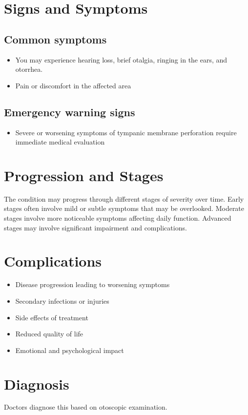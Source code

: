 \section{Signs and Symptoms}
\subsection{Common symptoms}
\begin{itemize}[noitemsep]
  \item You may experience hearing loss, brief otalgia, ringing in the ears, and otorrhea.
  \item Pain or discomfort in the affected area
  \end{itemize}
\subsection{Emergency warning signs}
\begin{itemize}[noitemsep]
  \item Severe or worsening symptoms of tympanic membrane perforation require immediate medical evaluation
\end{itemize}
\section{Progression and Stages}
The condition may progress through different stages of severity over time. Early stages often involve mild or subtle symptoms that may be overlooked. Moderate stages involve more noticeable symptoms affecting daily function. Advanced stages may involve significant impairment and complications.
\section{Complications}
\begin{itemize}[noitemsep]
  \item Disease progression leading to worsening symptoms
  \item Secondary infections or injuries
  \item Side effects of treatment
  \item Reduced quality of life
  \item Emotional and psychological impact
\end{itemize}
\section{Diagnosis}
Doctors diagnose this based on otoscopic examination.

